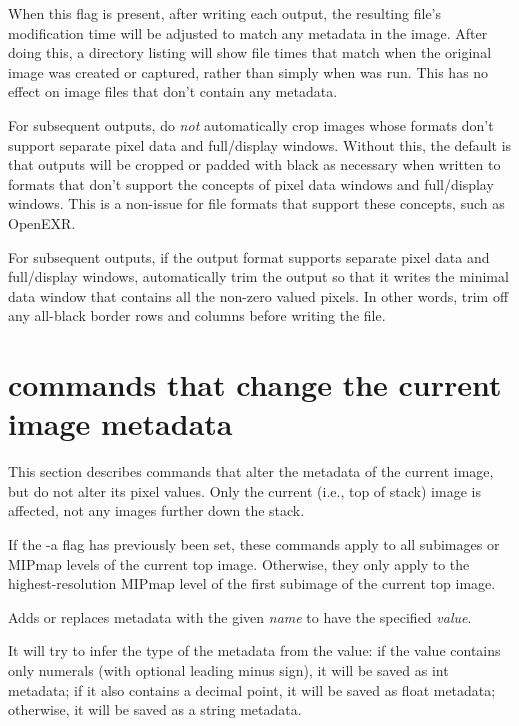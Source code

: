 When this flag is present, after writing each output, the resulting
file's modification time will be adjusted to match any 
metadata in the image.  After doing this, a directory listing will show
file times that match when the original image was created or captured,
rather than simply when \oiiotool was run.  This has no effect on
image files that don't contain any  metadata.
\apiend

For subsequent outputs, do \emph{not} automatically crop images whose
formats don't support separate pixel data and full/display windows.
Without this, the default is that outputs will be cropped or padded with
black as necessary when written to formats that don't support the
concepts of pixel data windows and full/display windows.  This is a
non-issue for file formats that support these concepts, such as OpenEXR.
\apiend

For subsequent outputs, if the output format supports separate pixel
data and full/display windows, automatically trim the output so that
it writes the minimal data window that contains all the non-zero valued
pixels.  In other words, trim off any all-black border rows and columns
before writing the file.
\apiend


\section{\oiiotool commands that change the current image metadata}

This section describes \oiiotool commands that alter the metadata
of the current image, but do not alter its pixel values.  Only the
current (i.e., top of stack) image is affected, not any images further
down the stack.

If the {\cf -a} flag has previously been set, these commands apply to
all subimages or MIPmap levels of the current top image.  Otherwise,
they only apply to the highest-resolution MIPmap level of the first
subimage of the current top image.

Adds or replaces metadata with the given \emph{name} to have the 
specified \emph{value}.

It will try to infer the type of the metadata from the value: if the
value contains only numerals (with optional leading minus sign), it will
be saved as {\cf int} metadata; if it also contains a decimal point, it
will be saved as {\cf float} metadata; otherwise, it will be saved as
a {\cf string} metadata.


